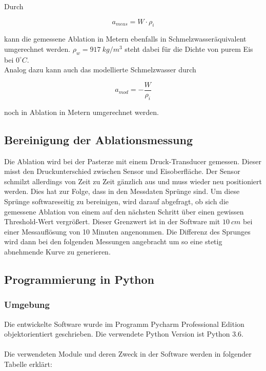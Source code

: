 \documentclass[11pt,a4paper]{article}
\begin{document}
Durch 

\begin{equation}
a_{meas} = W \cdot \rho_{i}
\end{equation}


kann die gemessene Ablation in Metern ebenfalls in Schmelzwasseräquivalent umgerechnet werden. $\rho_{w}=917~kg/m^3$ steht dabei für die Dichte von purem Eis bei $0^\circ C$.\\

Analog dazu kann auch das modellierte Schmelzwasser durch

\begin{equation}\label{eq:Schmelzwasser to Ablation}
a_{mod} = -\frac{W}{\rho_{i}}
\end{equation}

noch in Ablation in Metern umgerechnet werden.

\subsection{Bereinigung der Ablationsmessung}
Die Ablation wird bei der Pasterze mit einem Druck-Transducer gemessen. Dieser misst den Druckunterschied zwischen Sensor und Eisoberfläche. Der Sensor schmilzt allerdings von Zeit zu Zeit gänzlich aus und muss wieder neu positioniert werden. Dies hat zur Folge, dass in den Messdaten Sprünge sind. Um diese Sprünge softwareseitig zu bereinigen, wird darauf abgefragt, ob sich die gemessene Ablation von einem auf den nächsten Schritt über einen gewissen Threshold-Wert vergrößert. Dieser Grenzwert ist in der Software mit $10~cm$ bei einer Messauflösung von 10 Minuten angenommen. Die Differenz des Sprunges wird dann bei den folgenden Messungen angebracht um so eine stetig abnehmende Kurve zu generieren.



\subsection{Programmierung in Python}
\subsubsection{Umgebung}

Die entwickelte Software wurde im Programm Pycharm Professional Edition objektorientiert geschrieben. Die verwendete Python Version ist Python 3.6.\\\\
Die verwendeten Module und deren Zweck in der Software werden in folgender Tabelle erklärt:
\end{document}
